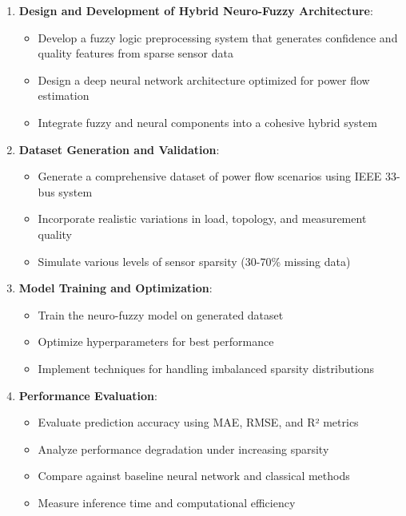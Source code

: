 \documentclass[12pt,a4paper]{report}
\begin{document}
\begin{enumerate}
    \item \textbf{Design and Development of Hybrid Neuro-Fuzzy Architecture}:
    \begin{itemize}
        \item Develop a fuzzy logic preprocessing system that generates confidence and quality features from sparse sensor data
        \item Design a deep neural network architecture optimized for power flow estimation
        \item Integrate fuzzy and neural components into a cohesive hybrid system
    \end{itemize}
    
    \item \textbf{Dataset Generation and Validation}:
    \begin{itemize}
        \item Generate a comprehensive dataset of power flow scenarios using IEEE 33-bus system
        \item Incorporate realistic variations in load, topology, and measurement quality
        \item Simulate various levels of sensor sparsity (30-70\% missing data)
    \end{itemize}
    
    \item \textbf{Model Training and Optimization}:
    \begin{itemize}
        \item Train the neuro-fuzzy model on generated dataset
        \item Optimize hyperparameters for best performance
        \item Implement techniques for handling imbalanced sparsity distributions
    \end{itemize}
    
    \item \textbf{Performance Evaluation}:
    \begin{itemize}
        \item Evaluate prediction accuracy using MAE, RMSE, and R² metrics
        \item Analyze performance degradation under increasing sparsity
        \item Compare against baseline neural network and classical methods
        \item Measure inference time and computational efficiency
    \end{itemize}
    

\end{enumerate}
\end{document}
